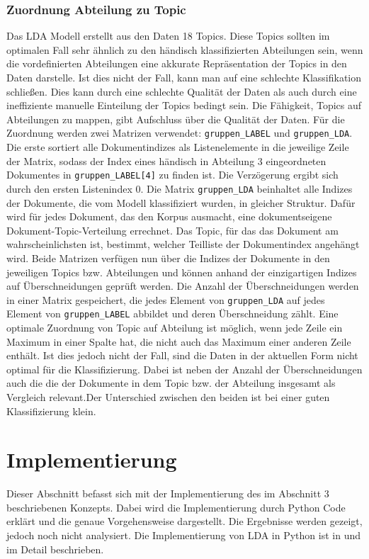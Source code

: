 \documentclass[german,version-2020-11]{uzl-thesis}
\begin{document}
\subsection{Zuordnung Abteilung zu Topic}
Das LDA Modell erstellt aus den Daten 18 Topics. Diese Topics sollten im optimalen Fall sehr ähnlich zu den händisch klassifizierten Abteilungen sein, wenn die vordefinierten Abteilungen eine akkurate Repräsentation der Topics in den Daten darstelle. Ist dies nicht der Fall, kann man auf eine schlechte Klassifikation schließen. Dies kann durch eine schlechte Qualität der Daten als auch durch eine ineffiziente manuelle Einteilung der Topics bedingt sein. Die Fähigkeit, Topics auf Abteilungen zu mappen, gibt Aufschluss über die Qualität der Daten. Für die Zuordnung werden zwei Matrizen verwendet: \lstinline{gruppen_LABEL} und \lstinline{gruppen_LDA}. Die erste sortiert alle Dokumentindizes als Listenelemente in die jeweilige Zeile der Matrix, sodass der Index eines händisch in Abteilung 3 eingeordneten Dokumentes in \lstinline{gruppen_LABEL[4]} zu finden ist. Die Verzögerung ergibt sich durch den ersten Listenindex $0$. Die Matrix \lstinline{gruppen_LDA} beinhaltet alle Indizes der Dokumente, die vom Modell klassifiziert wurden, in gleicher Struktur. Dafür wird für jedes Dokument, das den Korpus ausmacht, eine dokumentseigene Dokument-Topic-Verteilung errechnet. Das Topic, für das das Dokument am wahrscheinlichsten ist, bestimmt, welcher Teilliste der Dokumentindex angehängt wird. Beide Matrizen verfügen nun über die Indizes der Dokumente in den jeweiligen Topics bzw. Abteilungen und können anhand der einzigartigen Indizes auf Überschneidungen geprüft werden. Die Anzahl der Überschneidungen werden in einer Matrix gespeichert, die jedes Element von \lstinline{gruppen_LDA} auf jedes Element von \lstinline{gruppen_LABEL} abbildet und deren Überschneidung zählt. Eine optimale Zuordnung von Topic auf Abteilung ist möglich, wenn jede Zeile ein Maximum in einer Spalte hat, die nicht auch das Maximum einer anderen Zeile enthält. Ist dies jedoch nicht der Fall, sind die Daten in der aktuellen Form nicht optimal für die Klassifizierung. Dabei ist neben der Anzahl der Überschneidungen auch die die der Dokumente in dem Topic bzw. der Abteilung insgesamt als Vergleich relevant.Der Unterschied zwischen den beiden ist bei einer guten Klassifizierung klein. 

\chapter{Implementierung}%
Dieser Abschnitt befasst sich mit der Implementierung des im Abschnitt 3 beschriebenen Konzepts. Dabei wird die Implementierung durch Python Code erklärt und die genaue Vorgehensweise dargestellt. Die Ergebnisse werden gezeigt, jedoch noch nicht analysiert. Die Implementierung von LDA in  Python ist in \cite{radim} und \cite{towardsdata} im Detail beschrieben. \\
\end{document}
